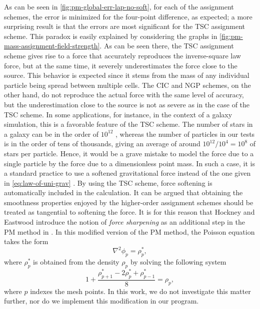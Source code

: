 As can be seen in \autoref{fig:pm-global-err-lap-no-soft}, for each of the assignment schemes, the error is minimized for the four-point difference, as expected;
a more surprising result is that the errors are most significant for the TSC assignment scheme.
This paradox is easily explained by considering the graphs in \autoref{fig:pm-mass-assignment-field-strength}.
As can be seen there, the TSC assignment scheme gives rise to a force that accurately reproduces the inverse-square law force, but at the same time, it severely underestimates the force close to the source.
This behavior is expected since it stems from the mass of any individual particle being spread between multiple cells.
The CIC and NGP schemes, on the other hand, do not reproduce the actual force with the same level of accuracy, but the underestimation close to the source is not as severe as in the case of the TSC scheme.
In some applications, for instance, in the context of a galaxy simulation, this is a favorable feature of the TSC scheme.
The number of stars in a galaxy can be in the order of $10^{12}$ \cite{young2006andromeda}, whereas the number of particles in our tests is in the order of tens of thousands, giving an average of around $10^{12} / 10^{4} = 10^8$ of stars per particle.
Hence, it would be a grave mistake to model the force due to a single particle by the force due to a dimensionless point mass.
In such a case, it is a standard practice to use a softened gravitational force instead of the one given in \autoref{eq:law-of-uni-grav} \cite{10.1046/j.1365-8711.2000.03316.x}.
By using the TSC scheme, force softening is automatically included in the calculation.
It can be argued that obtaining the smoothness properties enjoyed by the higher-order assignment schemes should be treated as tangential to softening the force.
It is for this reason that Hockney and Eastwood introduce the notion of \textit{force sharpening} as an additional step in the PM method in \cite{Hockney1988}.
In this modified version of the PM method, the Poisson equation takes the form
\begin{equation*}
    \nabla^2 \phi_p = \rho_p^*,
\end{equation*}
where $\rho^*_p$ is obtained from the density $\rho_p$ by solving the following system
\begin{equation*}
    1+\frac{\rho^*_{p+1} - 2\rho^*_p + \rho^*_{p-1}}{8}
    = \rho_p,
\end{equation*}
where $p$ indexes the mesh points.
In this work, we do not investigate this matter further, nor do we implement this modification in our program.

